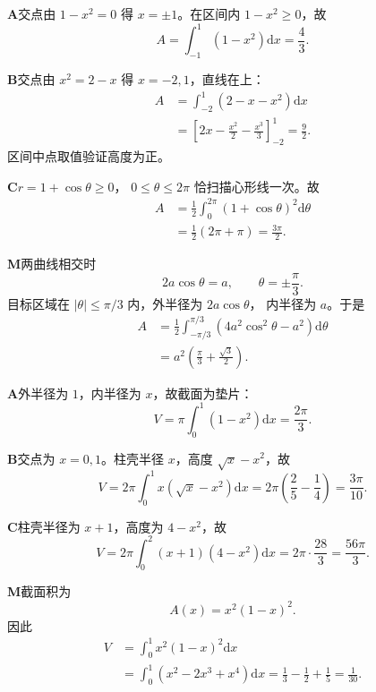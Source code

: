 \begin{solutionBox}
\textbf{A}\quad 交点由 \(1-x^2=0\) 得 \(x=\pm1\)。在区间内
\(1-x^2\ge0\)，故
\[
A=\int_{-1}^{1}(1-x^2)\mathrm dx
=\frac43.
\]
\end{solutionBox}
\begin{solutionBox}
\textbf{B}\quad 交点由 \(x^2=2-x\) 得 \(x=-2,1\)，直线在上：
\[
\begin{aligned}
A&=\int_{-2}^{1}(2-x-x^2)\mathrm dx\\
&=\left[2x-\frac{x^2}{2}-\frac{x^3}{3}\right]_{-2}^{1}
=\frac92.
\end{aligned}
\]
区间中点取值验证高度为正。
\end{solutionBox}
\begin{solutionBox}
\textbf{C}\quad \(r=1+\cos\theta\ge0\)，
\(0\le\theta\le2\pi\) 恰扫描心形线一次。故
\[
\begin{aligned}
A&=\frac12\int_0^{2\pi}(1+\cos\theta)^2\mathrm d\theta\\
&=\frac12(2\pi+\pi)=\frac{3\pi}{2}.
\end{aligned}
\]
\end{solutionBox}
\begin{solutionBox}
\textbf{M}\quad 两曲线相交时
\[
2a\cos\theta=a,\qquad \theta=\pm\frac\pi3.
\]
目标区域在 \(|\theta|\le\pi/3\) 内，外半径为 \(2a\cos\theta\)，
内半径为 \(a\)。于是
\[
\begin{aligned}
A&=\frac12\int_{-\pi/3}^{\pi/3}
\left(4a^2\cos^2\theta-a^2\right)\mathrm d\theta\\
&=a^2\left(\frac\pi3+\frac{\sqrt3}{2}\right).
\end{aligned}
\]
\end{solutionBox}

\begin{solutionBox}
\textbf{A}\quad 外半径为 \(1\)，内半径为 \(x\)，故截面为垫片：
\[
V=\pi\int_0^1(1-x^2)\mathrm dx=\frac{2\pi}{3}.
\]
\end{solutionBox}
\begin{solutionBox}
\textbf{B}\quad 交点为 \(x=0,1\)。柱壳半径 \(x\)，高度
\(\sqrt x-x^2\)，故
\[
V=2\pi\int_0^1x(\sqrt x-x^2)\mathrm dx
=2\pi\left(\frac25-\frac14\right)
=\frac{3\pi}{10}.
\]
\end{solutionBox}
\begin{solutionBox}
\textbf{C}\quad 柱壳半径为 \(x+1\)，高度为 \(4-x^2\)，故
\[
V=2\pi\int_0^2(x+1)(4-x^2)\mathrm dx
=2\pi\cdot\frac{28}{3}
=\frac{56\pi}{3}.
\]
\end{solutionBox}
\begin{solutionBox}
\textbf{M}\quad 截面积为
\[
A(x)=x^2(1-x)^2.
\]
因此
\[
\begin{aligned}
V&=\int_0^1x^2(1-x)^2\mathrm dx\\
&=\int_0^1(x^2-2x^3+x^4)\mathrm dx
=\frac13-\frac12+\frac15=\frac1{30}.
\end{aligned}
\]
\end{solutionBox}

